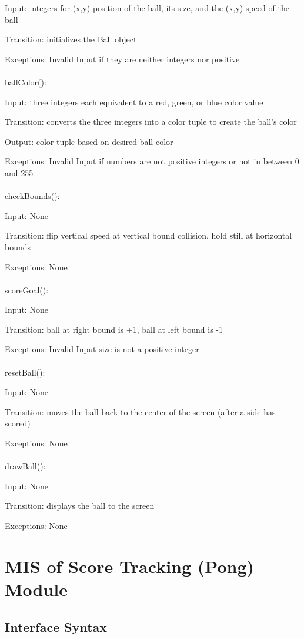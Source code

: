 \documentclass[12pt, titlepage]{article}
\begin{document}
		Input: integers for (x,y) position of the ball, its size, and the (x,y) speed of the ball
		
		Transition: initializes the Ball object
		
		Exceptions: Invalid Input if they are neither integers nor positive\\
		\\
		ballColor():
		
		Input: three integers each equivalent to a red, green, or blue color value
		
		Transition: converts the three integers into a color tuple to create the ball's color
		
		Output: color tuple based on desired ball color
		
		Exceptions: Invalid Input if numbers are not positive integers or not in between 0 and 255\\	
		\\
		checkBounds():
		
		Input: None
		
		Transition: flip vertical speed at vertical bound collision, hold still at horizontal bounds 
		
		Exceptions: None\\	
		\\
		scoreGoal():
		
		Input: None
		
		Transition: ball at right bound is +1, ball at left bound is -1
		
		Exceptions: Invalid Input size is not a positive integer\\
		\\
		resetBall():
		
		Input: None
		
		Transition: moves the ball back to the center of the screen (after a side has scored)
		
		Exceptions: None\\
		\\
		drawBall():
	    
		Input: None
		
		Transition: displays the ball to the screen
		
		Exceptions: None

\section{MIS of Score Tracking (Pong) Module}
		\subsection{Interface Syntax}
\end{document}
